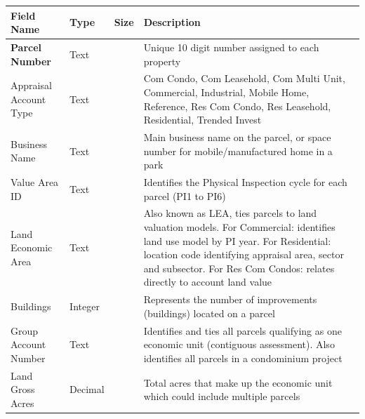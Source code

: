 \documentclass[
  english,
  letterpaper,
  DIV=11,
  numbers=noendperiod]{scrreprt}
\begin{document}
\begin{longtable}[]{@{}
  >{\raggedright\arraybackslash}p{}
  >{\raggedright\arraybackslash}p{}
  >{\raggedright\arraybackslash}p{}
  >{\raggedright\arraybackslash}p{}@{}}
\toprule\noalign{}
\begin{minipage}[b]{\linewidth}\raggedright
Field Name
\end{minipage} & \begin{minipage}[b]{\linewidth}\raggedright
Type
\end{minipage} & \begin{minipage}[b]{\linewidth}\raggedright
Size
\end{minipage} & \begin{minipage}[b]{\linewidth}\raggedright
Description
\end{minipage} \\
\midrule\noalign{}
\endhead
\bottomrule\noalign{}
\endlastfoot
\textbf{Parcel Number} & Text & 10 & Unique 10 digit number assigned to
each property \\
Appraisal Account Type & Text & 15 & Com Condo, Com Leasehold, Com Multi
Unit, Commercial, Industrial, Mobile Home, Reference, Res Com Condo, Res
Leasehold, Residential, Trended Invest \\
Business Name & Text & 50 & Main business name on the parcel, or space
number for mobile/manufactured home in a park \\
Value Area ID & Text & 10 & Identifies the Physical Inspection cycle for
each parcel (PI1 to PI6) \\
Land Economic Area & Text & 30 & Also known as LEA, ties parcels to land
valuation models. For Commercial: identifies land use model by PI year.
For Residential: location code identifying appraisal area, sector and
subsector. For Res Com Condos: relates directly to account land value \\
Buildings & Integer & & Represents the number of improvements
(buildings) located on a parcel \\
Group Account Number & Text & 30 & Identifies and ties all parcels
qualifying as one economic unit (contiguous assessment). Also identifies
all parcels in a condominium project \\
Land Gross Acres & Decimal & 15.4 & Total acres that make up the
economic unit which could include multiple parcels \\

\end{longtable}
\end{document}
